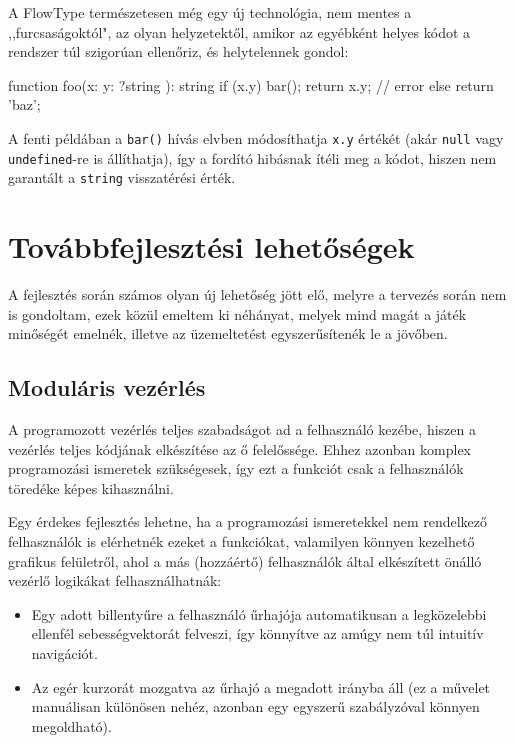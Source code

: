 A FlowType természetesen még egy új technológia, nem mentes a ,,furcsaságoktól",
az olyan helyzetektől, amikor az egyébként helyes kódot a rendszer túl szigorúan
ellenőriz, és helytelennek gondol:

\begin{js}
function foo(x: { y: ?string }): string {
  if (x.y) {
    bar();
    return x.y; // error
  } else {
    return 'baz';
  }
}
\end{js}

A fenti példában a \texttt{bar()} hívás elvben módosíthatja \texttt{x.y} értékét
(akár \texttt{null} vagy \texttt{undefined}-re is állíthatja), így a fordító
hibásnak ítéli meg a kódot, hiszen nem garantált a \texttt{string} visszatérési
érték.

\section{Továbbfejlesztési lehetőségek}

A fejlesztés során számos olyan új lehetőség jött elő, melyre a tervezés során
nem is gondoltam, ezek közül emeltem ki néhányat, melyek mind magát a játék
minőségét emelnék, illetve az üzemeltetést egyszerűsítenék le a jövőben.

\subsection{Moduláris vezérlés}

A programozott vezérlés teljes szabadságot ad a felhasználó kezébe, hiszen a
vezérlés teljes kódjának elkészítése az ő felelőssége. Ehhez azonban komplex
programozási ismeretek szükségesek, így ezt a funkciót csak a felhasználók
töredéke képes kihasználni.

Egy érdekes fejlesztés lehetne, ha a programozási ismeretekkel nem rendelkező
felhasználók is elérhetnék ezeket a funkciókat, valamilyen könnyen kezelhető
grafikus felületről, ahol a más (hozzáértő) felhasználók által elkészített
önálló vezérlő logikákat felhasználhatnák:

\begin{itemize}
  \item Egy adott billentyűre a felhasználó űrhajója automatikusan a
  legközelebbi ellenfél sebességvektorát felveszi, így könnyítve az amúgy nem
  túl intuitív navigációt.
  \item Az egér kurzorát mozgatva az űrhajó a megadott irányba áll (ez a művelet
  manuálisan különösen nehéz, azonban egy egyszerű szabályzóval könnyen
  megoldható).
\end{itemize}

